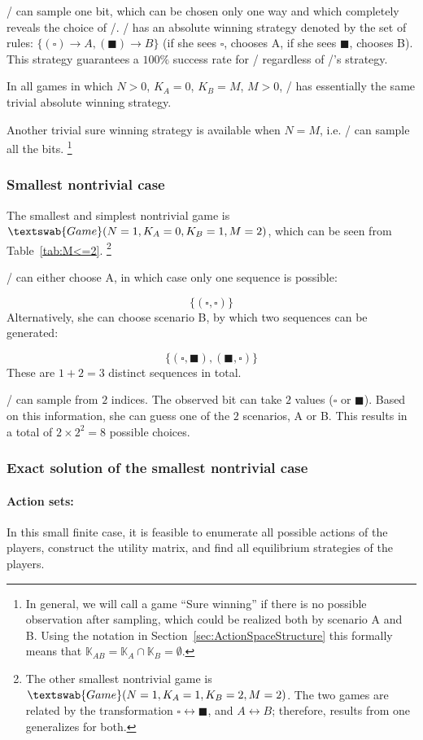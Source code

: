 \documentclass{article}
\newcommand{\wb}{\square}
\newcommand{\bb}{\blacksquare}
\theoremstyle{definition}
\newcommand{\G}[1]{$\textswab{Game}(#1)$}
\begin{document}
\PI/ can sample one bit, which can be chosen only one way and which completely reveals the choice of \PII/. \PI/ has an absolute winning strategy denoted by the set of rules: $\{(\wb) \to A, (\bb) \to B \}$ (if she sees $\wb$, chooses A, if she sees $\bb$, chooses B). This strategy guarantees a $100\%$ success rate for \PI/ regardless of \PII/'s strategy.

In all games in which $N>0$, $K_A = 0$, $K_B = M$, $M>0$,  \PI/ has essentially the same trivial absolute winning strategy.

Another trivial sure winning strategy is available when $N=M$, i.e. \PI/ can sample all the bits. \footnote{In general, we will call a game ``Sure winning'' if there is no possible observation after sampling, which could be realized both by scenario A and B. Using the notation in Section~\ref{sec:ActionSpaceStructure} this formally means that $\mathbb{K}_{AB} = \mathbb{K}_A \cap \mathbb{K}_B = \emptyset$.}


\subsubsection{Smallest nontrivial case}

The smallest and simplest nontrivial game is \G{N=1,K_A=0,K_B=1,M=2}, which can be seen from Table~\ref{tab:M<=2}. \footnote{The other smallest nontrivial game is \G{N=1,K_A=1,K_B=2,M=2}. The two games are related by the transformation $\wb \leftrightarrow \bb$, and $A \leftrightarrow B$; therefore, results from one generalizes for both.}

\PII/ can either choose A, in which case only one sequence is possible:

\[
\{(\wb, \wb)\}
\]
Alternatively, she can choose scenario B, by which two sequences can be generated:

\[
\{(\wb, \bb), (\bb, \wb)\}
\]
These are $1+2=3$ distinct sequences in total.

\PI/ can sample from $2$ indices. The observed bit can take $2$ values ($\wb$ or $\bb$). Based on this information, she can guess one of the $2$ scenarios, A or B. This results in a total of $2 \times 2 ^ 2 = 8$ possible choices.


\subsubsection{Exact solution of the smallest nontrivial case}

\paragraph{Action sets:}
In this small finite case, it is feasible to enumerate all possible actions of the players, construct the utility matrix, and find all equilibrium strategies of the players.
\end{document}
